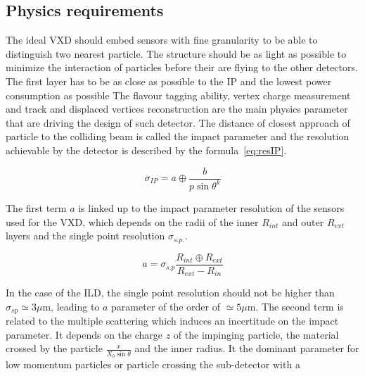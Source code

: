    \subsection{Physics requirements}

   The ideal \gls{VXD} should embed sensors with fine granularity to be able to distinguish two nearest particle.
   The structure should be as light as possible to minimize the interaction of particles before their are flying to the other detectors.
   The first layer has to be as close as possible to the \gls{IP} and the lowest power consumption as possible
   The flavour tagging ability, vertex charge measurement and track and displaced vertices reconstruction are the main physics parameter that are driving the design of such detector.
   The distance of closest approach of particle to the colliding beam is called the impact parameter and the resolution achievable by the detector is described by the formula~\ref{eq:resIP}.
    
    \begin{equation}
      \sigma_{IP} = a \oplus \frac{b}{p \sin{\theta}^{k}} 
      \label{eq:resIP}
    \end{equation}
   

   The first term $a$ is linked up to the impact parameter resolution of the sensors used for the \gls{VXD}, which depends on the radii of the inner $R_{int}$ and outer $R_{ext}$ layers and the single point resolution $\sigma_{s.p.}$.

   \begin{equation}
     a = \sigma_{s.p}\frac{R_{int} \oplus R_{ext}}{R_{ext} - R_{in}}
   \end{equation}

    In the case of the ILD, the single point resolution should not be higher than $\sigma_{sp} \simeq 3 \mu\text{m}$, leading to $a$ parameter of the order of $\simeq 5 \mu\text{m}$.
    The second term is related to the multiple scattering which induces an incertitude on the impact parameter.
    It depends on the charge $z$ of the impinging particle, the material crossed by the particle $\frac{x}{X_0 \sin{\theta}}$ and the inner radius.
    It the dominant parameter for low momentum particles or particle crossing the sub-detector with a 


